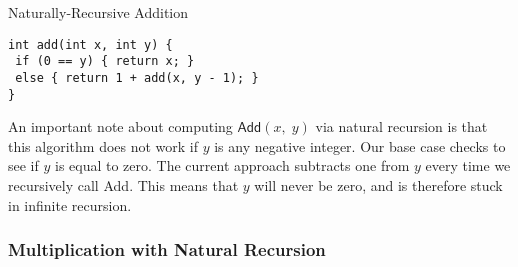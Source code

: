\begin{cl}[main.c]{Naturally-Recursive Addition}
\begin{lstlisting}[language=MyC]
int add(int x, int y) {
 if (0 == y) { return x; }
 else { return 1 + add(x, y - 1); }
}
\end{lstlisting}
\end{cl}

An important note about computing $\textsf{Add}(x,\;y)$ via natural recursion is that this algorithm does not work if $y$ is any negative integer. Our base case checks to see if $y$ is equal to zero. The current approach subtracts one from $y$ every time we recursively call \textsf{Add}. This means that $y$ will never be zero, and is therefore stuck in infinite recursion.

\subsubsection*{Multiplication with Natural Recursion}

